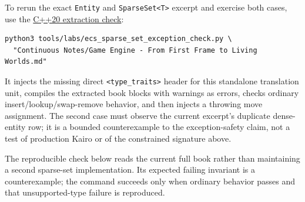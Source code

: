 To rerun the exact \texttt{Entity} and \texttt{SparseSet\textless{}T\textgreater{}} excerpt and exercise both cases, use the \hyperref[source-file-a82fe256cca93e1d7bd6eff8]{C++20 extraction check}:

\begin{verbatim}
python3 tools/labs/ecs_sparse_set_exception_check.py \
  "Continuous Notes/Game Engine - From First Frame to Living Worlds.md"
\end{verbatim}

It injects the missing direct \texttt{\textless{}type\_traits\textgreater{}} header for this standalone translation unit, compiles the extracted book blocks with warnings as errors, checks ordinary insert/lookup/swap-remove behavior, and then injects a throwing move assignment. The second case must observe the current excerpt's duplicate dense-entity row; it is a bounded counterexample to the exception-safety claim, not a test of production Kairo or of the constrained signature above.

The reproducible check below reads the current full book rather than maintaining a second sparse-set implementation. Its expected failing invariant is a counterexample; the command succeeds only when ordinary behavior passes and that unsupported-type failure is reproduced.

